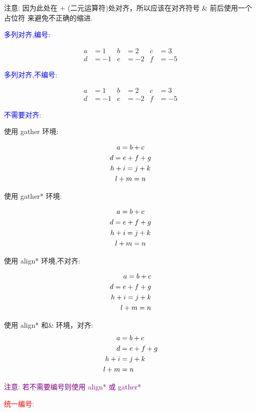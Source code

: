 \documentclass[UTF8]{ctexart}
\begin{document}
注意: 因为此处在 + (二元运算符)处对齐，所以应该在对齐符号 \& 前后使用一个占位符 {} 来避免不正确的缩进.

\textcolor{blue}{\large 多列对齐,编号:}


\begin{align} 
a &=1 & b &=2 & c &=3 \\ 
d &=-1 & e &=-2 & f &=-5 
\end{align}


\textcolor{blue}{\large 多列对齐,不编号:}


\begin{align*} 
a &=1 & b &=2 & c &=3 \\ 
d &=-1 & e &=-2 & f &=-5 
\end{align*}

\textcolor{blue}{\large 不需要对齐:}

使用 gather 环境:

\begin{gather} 
a = b + c \\ 
d = e + f + g \\ 
h + i = j + k \notag \\ 
l + m = n 
\end{gather}

使用 gather* 环境:

\begin{gather*} 
a = b + c \\ 
d = e + f + g \\ 
h + i = j + k \notag \\ 
l + m = n 
\end{gather*}


使用 align* 环境,不对齐:

\begin{align*} 
a = b + c \\ 
d = e + f + g \\ 
h + i = j + k \notag \\ 
l + m = n 
\end{align*}

使用 align* 和\& 环境，对齐:
\begin{align*} 
a &= b + c \\ 
d &= e + f + g \\ 
h + i &= j + k \notag \\ 
l + m &= n 
\end{align*}

\textcolor{purple}{注意: 若不需要编号则使用 align* 或 gather*}

\textcolor{red}{\Large  统一编号:}\\
\end{document}
